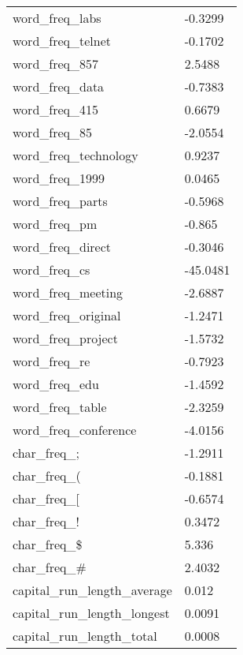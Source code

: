 \begin{tabular}{|l|l|}
word\_freq\_labs              &   -0.3299 \\
word\_freq\_telnet            &   -0.1702 \\
word\_freq\_857               &    2.5488 \\
word\_freq\_data              &   -0.7383 \\
word\_freq\_415               &    0.6679 \\
word\_freq\_85                &   -2.0554 \\
word\_freq\_technology        &    0.9237 \\
word\_freq\_1999              &    0.0465 \\
word\_freq\_parts             &   -0.5968 \\
word\_freq\_pm                &    -0.865 \\
word\_freq\_direct            &   -0.3046 \\
word\_freq\_cs                &  -45.0481 \\
word\_freq\_meeting           &   -2.6887 \\
word\_freq\_original          &   -1.2471 \\
word\_freq\_project           &   -1.5732 \\
word\_freq\_re                &   -0.7923 \\
word\_freq\_edu               &   -1.4592 \\
word\_freq\_table             &   -2.3259 \\
word\_freq\_conference        &   -4.0156 \\
char\_freq\_;                 &   -1.2911 \\
char\_freq\_(                 &   -0.1881 \\
char\_freq\_[                 &   -0.6574 \\
char\_freq\_!                 &    0.3472 \\
char\_freq\_\$                &      5.336 \\
char\_freq\_\#                &     2.4032 \\
capital\_run\_length\_average  &     0.012 \\
capital\_run\_length\_longest  &    0.0091 \\
capital\_run\_length\_total    &    0.0008 \\
\hline
\end{tabular}
